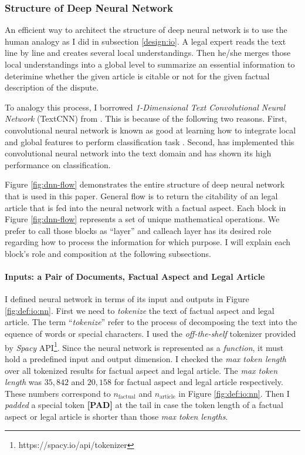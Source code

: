 \documentclass[12pt,letterpaper]{article}
\begin{document}
\subsubsection{Structure of Deep Neural Network}


An efficient way to architect the structure of deep neural network is to use the
human analogy as I did in subsection \ref{design:io}.
A legal expert reads the text line by line and creates several local understandings.
Then he/she merges those local understandings into a global level to summarize
an essential information to deterimine whether
the given article is citable or not for the given factual description of the dispute.

To analogy this process, I borrowed \textit{1-Dimensional Text Convolutional Neural Network} (TextCNN) from \cite{textcnn}.
This is because of the following two reasons.
First, convolutional neural network is known as good at learning how to integrate local and global features to perform classification task \citep{554195, 8227460}.
Second, \cite{textcnn} has implemented this convolutional neural network into the text domain
and has shown its high performance on classification.

Figure \ref{fig:dnn-flow} demonstrates the entire structure of deep neural network that is used in this paper.
General flow is to return the citability of an legal article that is fed into the neural network with a factual aspect.
Each block in Figure \ref{fig:dnn-flow} represents a set of unique mathematical operations.
We prefer to call those blocks as ``layer''
and calleach layer has its desired role regarding how to process the information for which purpose.
I will explain each block's role and composition at the following subsections.

\paragraph{Inputs: a Pair of Documents, Factual Aspect and Legal Article}

I defined neural network in terms of its input and outputs in Figure \ref{fig:def:io:nn}.
First we need to \textit{tokenize} the text of factual aspect and legal article. The term ``\textit{tokenize}''
refer to the process of decomposing the text into the equence of words or special characters.
I used the \textit{off-the-shelf} tokenizer provided by \textit{Spacy} API\footnote{https://spacy.io/api/tokenizer}.
Since the neural network is represented as a \textit{function}, it must hold a predefined input and output dimension.
I checked the \textit{max token length} over all tokenized results for factual aspect and legal article.
The \textit{max token length} was $35,842$ and $20,158$ for factual aspect and legal article respectively. These numbers correspond to $n_{\text{factual}}$ and $n_{\text{article}}$ in Figure \ref{fig:def:io:nn}.
Then I \textit{padded} a special token \textbf{[PAD]} at the tail in case the token length of a factual aspect
or legal article is shorter than those \textit{max token lengths}.
\end{document}
